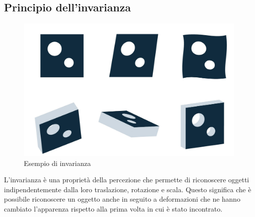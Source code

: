 \documentclass[11pt,a4paper]{article}
\begin{document}
\subsection{Principio dell'invarianza}
\begin{figure}
	\begin{center}
		\includegraphics[scale=0.3]{img/008.png}
	\end{center}
	\caption{Esempio di invarianza}
\end{figure}
L'invarianza è una proprietà della percezione che permette di riconoscere oggetti indipendentemente dalla loro traslazione, rotazione e scala. Questo significa che è possibile riconoscere un oggetto anche in seguito a deformazioni che ne hanno cambiato l'apparenza rispetto alla prima volta in cui è stato incontrato.
\pagebreak
\end{document}
